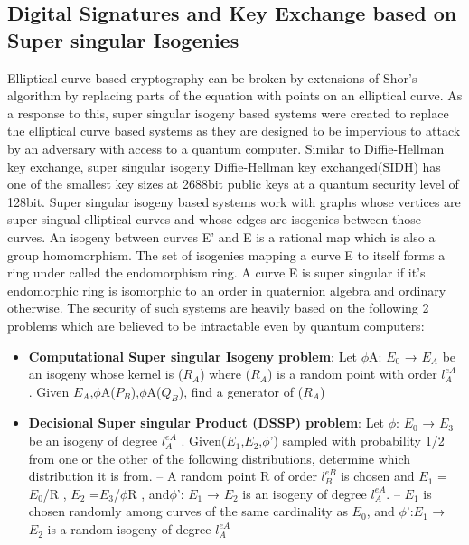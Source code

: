 \documentclass[10pt,a4paper]{IEEEtran}
\begin{document}
\subsection{Digital Signatures and Key Exchange based on Super singular Isogenies}
Elliptical curve based cryptography can be broken by extensions of Shor's algorithm by replacing parts of the equation with points on an elliptical curve. As a response to this, super singular isogeny based systems\cite{supersing} were created to replace the elliptical curve based systems as they are designed to be impervious to attack by an adversary with access to a quantum computer. Similar to Diffie-Hellman key exchange, super singular isogeny Diffie-Hellman key exchanged(SIDH) has one of the smallest key sizes at 2688bit public keys at a quantum security level of 128bit.
\newline
Super singular isogeny based systems work with graphs whose vertices are super singual elliptical curves and whose edges are isogenies between those curves. An isogeny between curves E' and E is a rational map which is also a group homomorphism.
The set of isogenies mapping a curve E to itself forms a ring under called the endomorphism ring. A curve E is super singular if it's endomorphic ring is isomorphic to an order in  quaternion algebra and ordinary otherwise.
\newline
\newline
The security of such systems are heavily based on the following 2 problems which are believed to be intractable even by quantum computers:
\begin{itemize}
\item \textbf{Computational Super singular Isogeny problem}:  Let \(\phi\)A: \(E_0\) → \(E_A\) be an isogeny whose kernel is (\(R_A\))	where (\(R_A\)) is a random point with order \(l^{eA}_A\) . Given \(E_A\),\(\phi\)A(\(P_B\)),\(\phi\)A(\(Q_B\)), ﬁnd a generator of (\(R_A\))	
\item \textbf{Decisional Super singular Product (DSSP) problem}: Let \(\phi\): \(E_0\) → \(E_3\) be an isogeny of degree \(l^{eA}_A\) . Given(\(E_1\),\(E_2\),\(\phi\)') sampled with probability 1/2 from one or the other of the following distributions, determine which distribution it is from.
\subitem –  A random point R of order \(l^{eB}_B\) is chosen and \(E_1\) = \(E_0\)/{R}	, \(E_2\) =\(E_3\)/\(\phi\){R}	, and\(\phi\)': \(E_1\) → \(E_2\) is an isogeny of degree \(l^{eA}_A\).
\subitem – \(E_1\) is chosen randomly among curves of the same cardinality as \(E_0\), and \(\phi\)':\(E_1\) → \(E_2\) is a random isogeny of degree \(l^{eA}_A\)
\end{itemize} 
\end{document}
